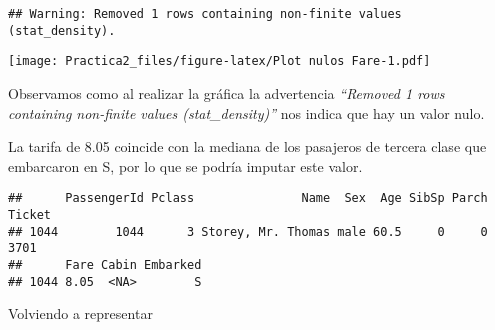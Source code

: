 \documentclass[]{article}
\newenvironment{Shaded}{\begin{snugshade}}{\end{snugshade}}
\newcommand{\KeywordTok}[1]{\textcolor[rgb]{0.13,0.29,0.53}{\textbf{#1}}}
\newcommand{\DataTypeTok}[1]{\textcolor[rgb]{0.13,0.29,0.53}{#1}}
\newcommand{\DecValTok}[1]{\textcolor[rgb]{0.00,0.00,0.81}{#1}}
\newcommand{\FloatTok}[1]{\textcolor[rgb]{0.00,0.00,0.81}{#1}}
\newcommand{\StringTok}[1]{\textcolor[rgb]{0.31,0.60,0.02}{#1}}
\newcommand{\OperatorTok}[1]{\textcolor[rgb]{0.81,0.36,0.00}{\textbf{#1}}}
\newcommand{\NormalTok}[1]{#1}
\begin{document}
\begin{verbatim}
## Warning: Removed 1 rows containing non-finite values (stat_density).
\end{verbatim}

\texttt{[image: Practica2\_files/figure-latex/Plot nulos Fare-1.pdf]}

Observamos como al realizar la gráfica la advertencia \emph{``Removed 1
rows containing non-finite values (stat\_density)''} nos indica que hay
un valor nulo.

La tarifa de 8.05 coincide con la mediana de los pasajeros de tercera
clase que embarcaron en S, por lo que se podría imputar este valor.

\begin{Shaded}
\end{Shaded}

\begin{verbatim}
##      PassengerId Pclass               Name  Sex  Age SibSp Parch Ticket
## 1044        1044      3 Storey, Mr. Thomas male 60.5     0     0   3701
##      Fare Cabin Embarked
## 1044 8.05  <NA>        S
\end{verbatim}

Volviendo a representar

\begin{Shaded}
\end{Shaded}
\end{document}
